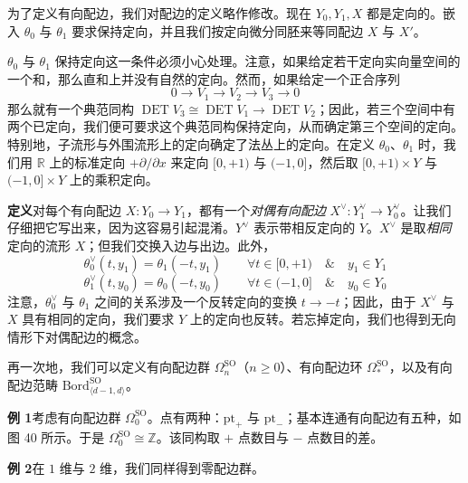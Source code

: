为了定义有向配边，我们对配边的定义略作修改。现在 $Y_0,Y_1,X$ 都是定向的。嵌入 $\theta_0$ 与 $\theta_1$ 要求保持定向，并且我们按定向微分同胚来等同配边 $X$ 与 $X'$。

$\theta_0$ 与 $\theta_1$ 保持定向这一条件必须小心处理。注意，如果给定若干定向实向量空间的一个和，那么直和上并没有自然的定向。然而，如果给定一个正合序列
\begin{equation}
  0\to V_1\to V_2\to V_3\to 0
  \tag{L.4}
  \label{eq:L.4}
\end{equation}
那么就有一个典范同构 $\operatorname{DET}V_3\cong\operatorname{DET}V_1\to\operatorname{DET}V_2$；因此，若三个空间中有两个已定向，我们便可要求这个典范同构保持定向，从而确定第三个空间的定向。特别地，子流形与外围流形上的定向确定了法丛上的定向。在定义 $\theta_0$、$\theta_1$ 时，我们用 $\mathbb{R}$ 上的标准定向 $+\partial/\partial x$ 来定向 $[0,+1)$ 与 $(-1,0]$，然后取 $[0,+1)\times Y$ 与 $(-1,0]\times Y$ 上的乘积定向。


\textbf{定义}\quad 对每个有向配边 $X:Y_0\to Y_1$，都有一个\emph{对偶有向配边} $X^\vee:Y_1^\vee\to Y_0^\vee$。让我们仔细把它写出来，因为这容易引起混淆。$Y^\vee$ 表示带相反定向的 $Y$。$X^\vee$ 是取\emph{相同}定向的流形 $X$；但我们交换入边与出边。此外，
\begin{equation}
  \theta_0^\vee(t,y_1)=\theta_1(-t,y_1) \qquad \forall t\in[0,+1)\quad\&\quad y_1\in Y_1
  \tag{L.5}
  \label{eq:L.5}
\end{equation}
\begin{equation}
  \theta_1^\vee(t,y_0)=\theta_0(-t,y_0) \qquad \forall t\in(-1,0]\quad\&\quad y_0\in Y_0
  \tag{L.6}
  \label{eq:L.6}
\end{equation}
注意，$\theta_0^\vee$ 与 $\theta_1$ 之间的关系涉及一个反转定向的变换 $t\to -t$；因此，由于 $X^\vee$ 与 $X$ 具有相同的定向，我们要求 $Y$ 上的定向也反转。若忘掉定向，我们也得到无向情形下对偶配边的概念。

再一次地，我们可以定义有向配边群 $\Omega_n^{\mathrm{SO}}$（$n\ge 0$）、有向配边环 $\Omega_*^{\mathrm{SO}}$，以及有向配边范畴 $\mathrm{Bord}^{\mathrm{SO}}_{\langle d-1,d\rangle}$。

\textbf{例 1}\quad 考虑有向配边群 $\Omega_0^{\mathrm{SO}}$。点有两种：$\mathrm{pt}_+$ 与 $\mathrm{pt}_-$；基本连通有向配边有五种，如图 40 所示。于是 $\Omega_0^{\mathrm{SO}}\cong\mathbb{Z}$。该同构取 $+$ 点数目与 $-$ 点数目的差。

\textbf{例 2}\quad 在 $1$ 维与 $2$ 维，我们同样得到零配边群。
